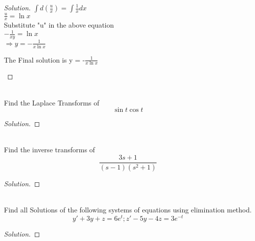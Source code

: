 \documentclass[12pt]{article}
\newenvironment{problem}[2][Problem]{\begin{trivlist}
\item[\hskip \labelsep {\bfseries #1}\hskip \labelsep {\bfseries #2.}]}{\end{trivlist}}
\begin{document}
\begin{proof}[Solution]
$\int d(\frac{u}{x}) = \int \frac{1}{x} dx $ \\

$\frac{u}{x}  = \ln{x} $ \\

Substitute  "u" in the above equation \\

$-\frac{1}{xy} = \ln{x} $ \\

$\Rightarrow y = -\frac{1}{x\ln{x}}$ \\

\begin{Large} The Final solution is  y = -$ \frac{1}{x \ln{x}} $\end{Large}
\end{proof}

\begin{problem}{4}
\text{ }\\
Find the Laplace Transforms of\\
$$\sin{t} \cos{t}$$ 
\end{problem}
 
\begin{proof}[Solution]

\end{proof}

\begin{problem}{5}
\text{ }\\
Find the inverse transforms of\\
  $$\frac{3s+1}{(s-1)(s^2+1)}$$
\end{problem}
 
\begin{proof}[Solution]

\end{proof}

\begin{problem}{6}
\text{ }\\
Find all Solutions of the following systems of equations using elimination method.\\
    $$y'+3y+z = 6e^t ; z'-5y-4z = 3e^{-t}$$

\end{problem}
 
\begin{proof}[Solution]

\end{proof}
\end{document}
